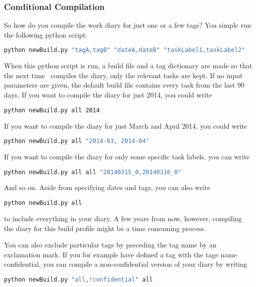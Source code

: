 \subsubsection*{Conditional Compilation}
So how do you compile the work diary for just one or a few tags? You simple run the following python script.
\begin{lstlisting}[language=bash]
python newBuild.py "tagA,tagB" "dateA,dateB" "taskLabel1,taskLabel2"
\end{lstlisting}
When this python script is run, a build file and a tag dictionary are made so that the next time \LaTeXe\ compiles the diary, only the relevant tasks are kept. If no input parameters are given, the default build file contains every task from the last 90 days. If you want to compile the diary for just 2014, you could write
\begin{lstlisting}[language=bash]
python newBuild.py all 2014
\end{lstlisting}
If you want to compile the diary for just March and April 2014, you could write
\begin{lstlisting}[language=bash]
python newBuild.py all "2014-03, 2014-04"
\end{lstlisting}
If you want to compile the diary for only some specific task labels, you can write
\begin{lstlisting}[language=bash]
python newBuild.py all all "20140315_0,20140316_0"
\end{lstlisting}
And so on. Aside from specifying dates and tags, you can also write
\begin{lstlisting}[language=bash]
python newBuild.py all
\end{lstlisting}
to include everything in your diary. A few years from now, however, compiling the diary for this build profile might be a time consuming process.

You can also exclude particular tags by preceding the tag name by an exclamation mark. If you for example have defined a tag with the tage name confidential, you can compile a non-confidential version of your diary by writing
\begin{lstlisting}[language=bash]
python newBuild.py "all,!confidential" all
\end{lstlisting}

